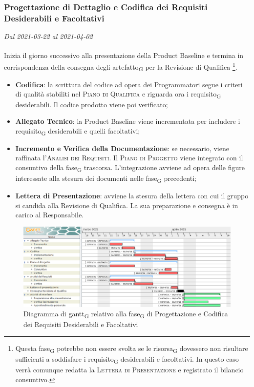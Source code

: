 \subsubsection{Progettazione di Dettaglio e Codifica dei Requisiti Desiderabili e Facoltativi}

\textit{Dal 2021-03-22 al 2021-04-02}
\\\\
Inizia il giorno successivo alla presentazione della Product Baseline e termina in corrispondenza della consegna degli artefatto\textsubscript{G} per la Revisione di Qualifica \footnote{Questa fase\textsubscript{G} potrebbe non essere svolta se le risorsa\textsubscript{G} dovessero non risultare sufficienti a soddisfare i requisito\textsubscript{G} desiderabili e facoltativi. In questo caso verrà comunque redatta la \textsc{Lettera di Presentazione} e registrato il bilancio consuntivo.}.
\begin{itemize}
	\item \textbf{Codifica}: la scrittura del codice ad opera dei Programmatori segue i criteri di qualità stabiliti nel \textsc{Piano di Qualifica} e riguarda ora i requisito\textsubscript{G} desiderabili. Il codice prodotto viene poi verificato;
	\item \textbf{Allegato Tecnico}: la Product Baseline viene incrementata per includere i requisito\textsubscript{G} desiderabili e quelli facoltativi;
	\item \textbf{Incremento e Verifica della Documentazione}: se necessario, viene raffinata l'\textsc{Analisi dei Requisiti}. Il \textsc{Piano di Progetto} viene integrato con il consuntivo della fase\textsubscript{G} trascorsa. L'integrazione avviene ad opera delle figure interessate alla stesura dei documenti nelle fase\textsubscript{G} precedenti;
	\item \textbf{Lettera di Presentazione}: avviene la stesura della lettera con cui il gruppo si candida alla Revisione di Qualifica. La sua preparazione e consegna è in carico al Responsabile.
	
\end{itemize}


\begin{figure}[H]
	\centering
	\includegraphics[scale=0.48]{res/images/05_gantt_codifica_desiderabili.png}
	\caption{Diagramma di gantt\textsubscript{G} relativo alla fase\textsubscript{G} di Progettazione e Codifica dei Requisiti Desiderabili e Facoltativi}
\end{figure}



